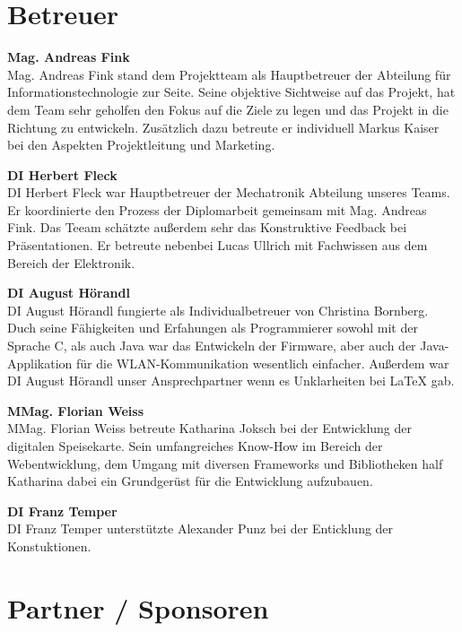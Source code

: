 \section{Betreuer}
  \textbf{Mag. Andreas Fink}\\
  Mag. Andreas Fink stand dem Projektteam als Hauptbetreuer der Abteilung für Informationstechnologie zur Seite.
  Seine objektive Sichtweise auf das Projekt, hat dem Team sehr geholfen den Fokus auf die Ziele zu legen und
  das Projekt in die Richtung zu entwickeln.
  Zusätzlich dazu betreute er individuell Markus Kaiser bei den Aspekten Projektleitung und Marketing.

  \textbf{DI Herbert Fleck}\\
  DI Herbert Fleck war Hauptbetreuer der Mechatronik Abteilung unseres Teams. Er koordinierte den Prozess der Diplomarbeit
  gemeinsam mit Mag. Andreas Fink. Das Teeam schätzte außerdem sehr das Konstruktive Feedback bei Präsentationen.
  Er betreute nebenbei Lucas Ullrich mit Fachwissen aus dem Bereich der Elektronik.

  \textbf{DI August Hörandl}\\
  DI August Hörandl fungierte als Individualbetreuer von Christina Bornberg. Duch seine Fähigkeiten und
  Erfahungen als Programmierer sowohl mit der Sprache C, als auch Java war das Entwickeln der Firmware,
  aber auch der Java-Applikation für die WLAN-Kommunikation wesentlich einfacher. Außerdem war
  DI August Hörandl unser Ansprechpartner wenn es Unklarheiten bei LaTeX gab.

  \textbf{MMag. Florian Weiss}\\
  MMag. Florian Weiss betreute Katharina Joksch bei der Entwicklung der digitalen Speisekarte. Sein umfangreiches
  Know-How im Bereich der Webentwicklung, dem Umgang mit diversen Frameworks und Bibliotheken half Katharina
  dabei ein Grundgerüst für die Entwicklung aufzubauen.

  \textbf{DI Franz Temper}\\
  DI Franz Temper unterstützte Alexander Punz bei der Enticklung der Konstuktionen.

\section{Partner / Sponsoren}



